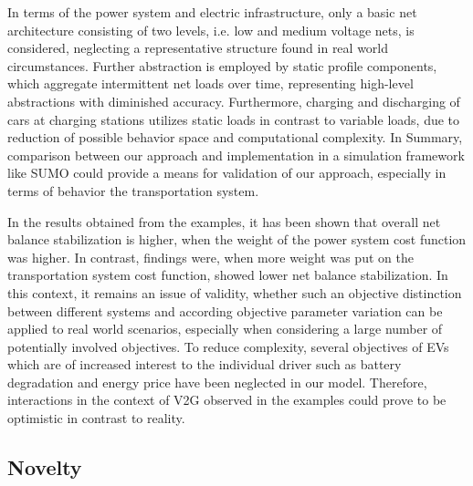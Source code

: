 In terms of the power system and electric infrastructure, only a basic net architecture consisting of two levels, i.e. low and medium voltage nets, is considered, neglecting a representative structure found in real world circumstances. Further abstraction is employed by static profile components, which aggregate intermittent net loads over time, representing high-level abstractions with diminished accuracy. Furthermore, charging and discharging of cars at charging stations utilizes static loads in contrast to variable loads, due to reduction of possible behavior space and computational complexity. In Summary, comparison between our approach and implementation in a simulation framework like SUMO could provide a means for validation of our approach, especially in terms of behavior the transportation system.

In the results obtained from the examples, it has been shown that overall net balance stabilization is higher, when the weight of the power system cost function was higher. In contrast, findings were, when more weight was put on the transportation system cost function, showed lower net balance stabilization. In this context, it remains an issue of validity, whether such an objective distinction between different systems and according objective parameter variation can be applied to real world scenarios, especially when considering a large number of potentially involved objectives. To reduce complexity, several objectives of EVs which are of increased interest to the individual driver such as battery degradation and energy price have been neglected in our model. Therefore, interactions in the context of V2G observed in the examples could prove to be optimistic in contrast to reality. 


\subsection{Novelty}


